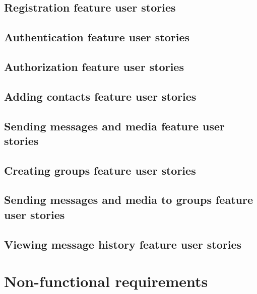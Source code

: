 \subsection{Registration feature user stories}

\subsection{Authentication feature user stories}

\subsection{Authorization feature user stories}

\subsection{Adding contacts feature user stories}

\subsection{Sending messages and media feature user stories}

\subsection{Creating groups feature user stories}

\subsection{Sending messages and media to groups feature user stories}

\subsection{Viewing message history feature user stories}


\section{Non-functional requirements}\label{sec:non-functional-requirements}